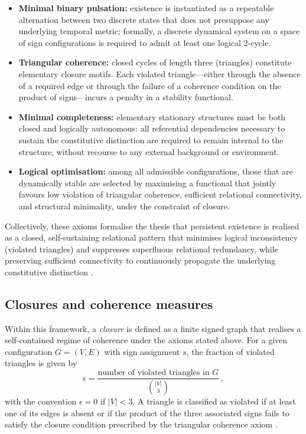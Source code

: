 \documentclass{article}
\begin{document}
\begin{itemize}[leftmargin=1.5em]
  \item \textbf{Minimal binary pulsation:} existence is instantiated as a repeatable alternation between two discrete states that does not presuppose any underlying temporal metric; formally, a discrete dynamical system on a space of sign configurations is required to admit at least one logical 2-cycle.

  \item \textbf{Triangular coherence:} closed cycles of length three (triangles) constitute elementary closure motifs. Each violated triangle—either through the absence of a required edge or through the failure of a coherence condition on the product of signs—incurs a penalty in a stability functional.

  \item \textbf{Minimal completeness:} elementary stationary structures must be both closed and logically autonomous: all referential dependencies necessary to sustain the constitutive distinction are required to remain internal to the structure, without recourse to any external background or environment.

  \item \textbf{Logical optimisation:} among all admissible configurations, those that are dynamically stable are selected by maximising a functional that jointly favours low violation of triangular coherence, sufficient relational connectivity, and structural minimality, under the constraint of closure.
\end{itemize}

Collectively, these axioms formalise the thesis that persistent existence is realised as a closed, self-sustaining relational pattern that minimises logical inconsistency (violated triangles) and suppresses superfluous relational redundancy, while preserving sufficient connectivity to continuously propagate the underlying constitutive distinction \cite{PDL_Main_2026,PDL_position}.

\subsection{Closures and coherence measures}
\label{subsec:closures}

Within this framework, a \emph{closure} is defined as a finite signed graph that realises a self-contained regime of coherence under the axioms stated above. For a given configuration \(G=(V,E)\) with sign assignment \(s\), the fraction of violated triangles is given by
\[
  \epsilon = \frac{\text{number of violated triangles in } G}{\binom{|V|}{3}} \, ,
\]
with the convention \(\epsilon = 0\) if \(|V| < 3\). A triangle is classified as violated if at least one of its edges is absent or if the product of the three associated signs fails to satisfy the closure condition prescribed by the triangular coherence axiom
\cite{PDL_Main_2026}.
\end{document}
